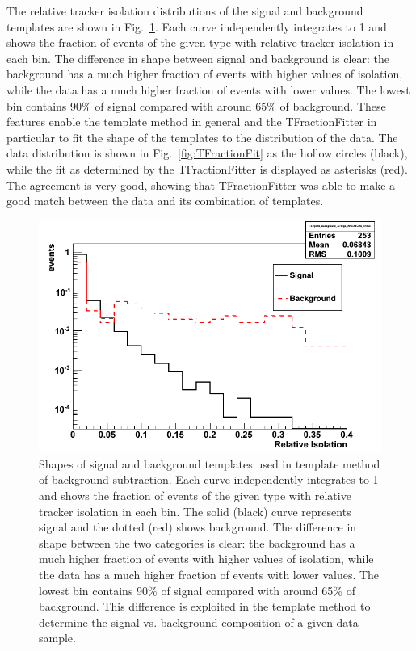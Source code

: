 
The relative tracker isolation distributions of the 
signal and background templates are shown in 
Fig.~\ref{fig:TemplateShapes}.  
Each curve independently integrates to 1
and shows the fraction of events of the given type
with relative tracker isolation in each bin.
The difference in shape between signal and background 
is clear:
the background has a much higher fraction of events
with higher values of isolation,
while the data has a much higher fraction of events
with lower values.
The lowest bin contains 90\% of signal compared with
around 65\% of background.
These features enable the template method in general 
and the TFractionFitter in particular 
to fit the shape of the templates to the 
distribution of the data.  
The data distribution is shown in 
Fig.~\ref{fig:TFractionFit} 
as the hollow circles (black), 
while the fit as determined by the
TFractionFitter is displayed as asterisks (red).  
The agreement is very good, showing that 
TFractionFitter was able to make a good 
match between the data and its combination 
of templates.  

 \begin{figure}[htb]
  \begin{center}
    \includegraphics[width=360pt]{Figures/TemplateShapes-01Mar11-lines.png}
  \end{center}
  \caption[Shapes of signal and background templates used in 
    template method of background subtraction]{
    Shapes of signal and background templates 
    used in template method of background subtraction.
    Each curve independently integrates to 1 
    and shows the fraction of events of the given type 
    with relative tracker isolation in each bin.  
    The solid (black) curve represents signal 
    and the dotted (red) shows background.  
    The difference in shape between the two categories 
    is clear: 
    the background has a much higher fraction of events 
    with higher values of isolation, 
    while the data has a much higher fraction of events 
    with lower values.  
    The lowest bin contains 90\% of signal compared with 
    around 65\% of background.  
    This difference is exploited 
    in the template method 
    to determine the 
    signal vs. background composition of a given 
    data sample.  
  }
  \label{fig:TemplateShapes}
 \end{figure}

